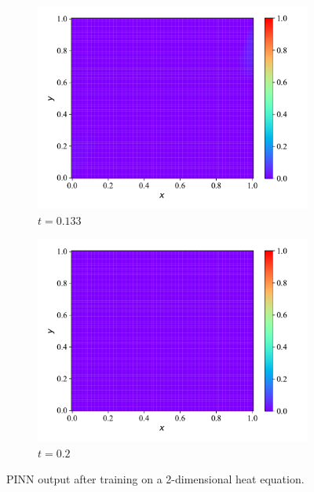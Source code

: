\begin{figure}[H]
\begin{subfigure}[b]{0.45\textwidth}
         \centering
         \includegraphics[width=\textwidth]{Figures/InitialExperiments/heat2d_3.pdf}
         \caption{$t = 0.133$}
         \label{fig:heat2d_3}
     \end{subfigure}
     \hfill
     \begin{subfigure}[b]{0.45\textwidth}
         \centering
         \includegraphics[width=\textwidth]{Figures/InitialExperiments/heat2d_4.pdf}
         \caption{$t = 0.2$}
         \label{fig:heat2d_4}
     \end{subfigure}
    \caption{PINN output after training on a 2-dimensional heat equation.}
    \label{fig:heat2d}
\end{figure}

